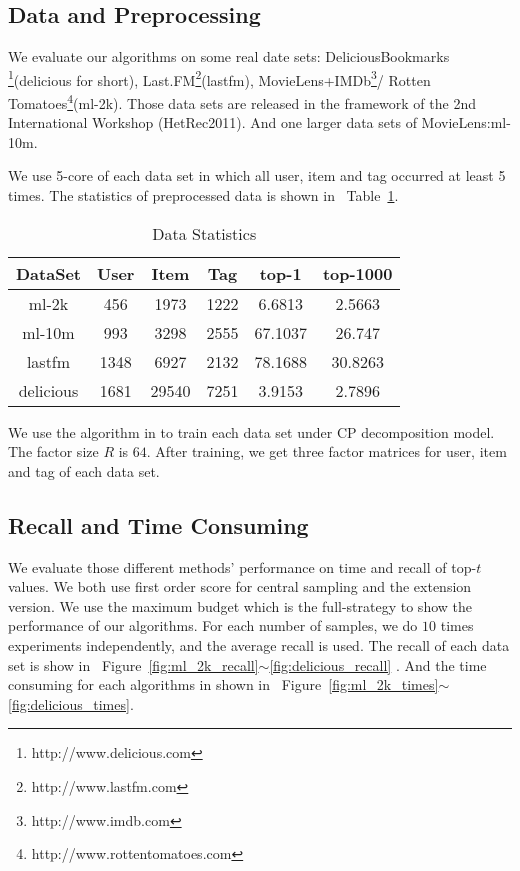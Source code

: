 \documentclass[letterpaper]{article}
\newcommand{\Figs}[2]  {Figure~\ref{fig:#1}$\sim$\ref{fig:#2}}
\newcommand{\Table}[1] {Table~\ref{table:#1}}
\begin{document}
\subsection{Data and Preprocessing}
We evaluate our algorithms on some real date sets:
DeliciousBookmarks
\footnote{http://www.delicious.com}(delicious for short),
Last.FM\footnote{http://www.lastfm.com}(lastfm),
MovieLens+IMDb\footnote{http://www.imdb.com }/
Rotten Tomatoes\footnote{http://www.rottentomatoes.com}(ml-2k).
Those data sets are released in the framework of the 2nd International Workshop (HetRec2011).
And one larger data sets of MovieLens\cite{Harper2015}:ml-10m.

We use 5-core of each data set in which all user, item and tag occurred at least 5 times.
The statistics of preprocessed data is shown in ~\Table{Data}.
\begin{table}[ht]
  \centering
  \begin{tabular}{|c|c|c|c|c|c|}
    \hline
    DataSet     & User & Item    & Tag    & top-1   & top-1000\\
    \hline
    ml-2k       & 456  &  1973   &  1222  & 6.6813  & 2.5663 \\
    ml-10m      & 993  &  3298   &  2555  & 67.1037 & 26.747 \\
    lastfm      & 1348 &  6927   &  2132  & 78.1688 & 30.8263\\
    delicious   & 1681 &  29540  &  7251  & 3.9153  & 2.7896 \\
    \hline
  \end{tabular}
  \caption{Data Statistics}
  \label{table:Data}
\end{table}
We use the algorithm in \cite{Rendle_RTF} to train each data set under CP decomposition model.
The factor size $R$ is $64$.
After training, we get three factor matrices for user, item and tag of each data set.

\subsection{Recall and Time Consuming}
We evaluate those different methods' performance on time and recall of top-$t$ values.
We both use first order score for central sampling and the extension version.
We use the maximum budget which is the full-strategy to show the performance of our algorithms.
For each number of samples, we do $10$ times experiments independently, and the average recall is used.
The recall of each data set is show in ~\Figs{ml_2k_recall}{delicious_recall} .
And the time consuming for each algorithms in shown in ~\Figs{ml_2k_times}{delicious_times}.
\end{document}
